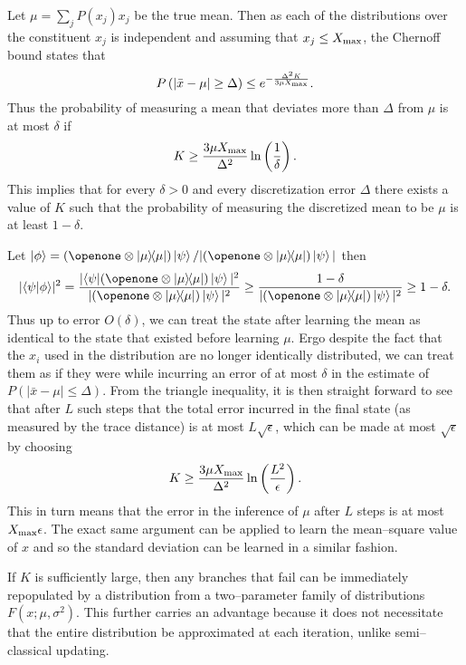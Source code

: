\documentclass[aps,amsmath,onecolumn,amssymb,notitlepage]{revtex4-1}
\begin{document}
Let $\mu= \sum_j P(x_j) x_j$ be the true mean.  Then as each of the distributions over the constituent $x_j$ is independent and assuming that $x_j \le X_{\rm max}$, the Chernoff bound states that
\begin{equation}
P\left(\left|\bar{x} - \mu\right|\ge \Delta \right)\le e^{-\frac{\Delta^2 K}{3\mu X_{\rm max}}}.
\end{equation}
Thus the probability of measuring a mean that deviates more than $\Delta$ from $\mu$ is at most $\delta$ if
\begin{equation}
K\ge \frac{3\mu X_{\rm max}}{\Delta^2}\ln\left(\frac{1}{\delta} \right).
\end{equation}
This implies that for every $\delta>0$ and every discretization error $\Delta$ there exists a value of $K$ such that the probability of measuring the discretized mean to be $\mu$ is at least $1-\delta$.

Let $\ket{\phi} = (\openone \otimes \ketbra{\mu}{\mu}) \ket{\psi} / |(\openone \otimes \ketbra{\mu}{\mu}) \ket{\psi}|$ then
\begin{equation}
|\braket{\psi}{\phi}|^2 = \frac{|\bra{\psi} (\openone \otimes \ketbra{\mu}{\mu}) \ket{\psi}|^2}{|(\openone \otimes \ketbra{\mu}{\mu}) \ket{\psi}|^2} \ge \frac{1-\delta}{|(\openone \otimes \ketbra{\mu}{\mu}) \ket{\psi}|^2} \ge 1-\delta.
\end{equation}
Thus up to error $O(\delta)$, we can treat the state after learning the mean as identical to the state that existed before learning $\mu$.  Ergo despite the fact that the $x_i$ used in the distribution are no longer identically distributed, we can treat them as if they were while incurring an error of at most $\delta$ in the estimate of $P(|\bar{x} - \mu|\le \Delta)$.  
From the triangle inequality, it is then straight forward to see that after $L$ such steps that the total error incurred in the final state (as measured by the trace distance) is at most $L\sqrt{\epsilon}$, which can be made at most $\sqrt{\epsilon}$ by choosing 
\begin{equation}
K\ge \frac{3\mu X_{\rm max}}{\Delta^2}\ln\left(\frac{L^2}{{\epsilon}} \right).
\end{equation}
This in turn means that the error in the inference of $\mu$ after $L$ steps is at most $X_{\rm max} \epsilon$.  The exact same argument can be applied to learn the mean--square value of $x$ and so the standard deviation can be learned in a similar fashion.

If $K$ is sufficiently large, then any branches that fail can be immediately repopulated by a distribution from a two--parameter family of distributions $F(x;\mu,\sigma^2)$.  This further carries an advantage because it does not necessitate that the entire distribution be approximated at each iteration, unlike semi--classical updating.
\end{document}
